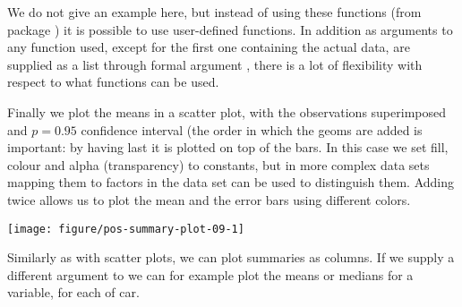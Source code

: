 \documentclass[krantz2]{krantz}\usepackage{knitr}%
\begin{document}
We do not give an example here, but instead of using these functions (from package \Hmisc) it is possible to use user-defined functions. In addition as arguments to any function used, except for the first one containing the actual data, are supplied as a list through formal argument , there is a lot of flexibility with respect to what functions can be used.

Finally we plot the means in a scatter plot, with the observations superimposed and $p = 0.95$ confidence interval (the order in which the geoms are added is important: by having  last it is plotted on top of the bars. In this case we set fill, colour and alpha (transparency) to constants, but in more complex data sets mapping them to factors in the data set can be used to distinguish them. Adding  twice allows us to plot the mean and the error bars using different colors.

\begin{knitrout}\footnotesize
{}\color{fgcolor}\begin{kframe}
\begin{alltt}
\hlstd{(}  \hlstd{(}    \hlopt{+}
  \hlstd{(} \hlstd{=} \hlstd{,}  \hlstd{=} \hlstd{,}
                \hlstd{=} \hlstd{,}  \hlstd{=} \hlstd{)} \hlopt{+}
  \hlstd{(} \hlstd{=} \hlstd{,}
                \hlstd{=} \hlstd{,}
                \hlstd{=} \hlstd{,}  \hlstd{=} \hlstd{,}  \hlstd{=} \hlstd{)} \hlopt{+}
  \hlstd{(} \hlstd{=} \hlstd{,}  \hlstd{=} \hlstd{)}
\end{alltt}
\end{kframe}

{\centering \texttt{[image: figure/pos-summary-plot-09-1]} 

}



\end{knitrout}

Similarly as with scatter plots, we can plot summaries as columns.
If we supply a different argument to  we can for example plot the means or medians for a variable, for each  of car.
\end{document}

